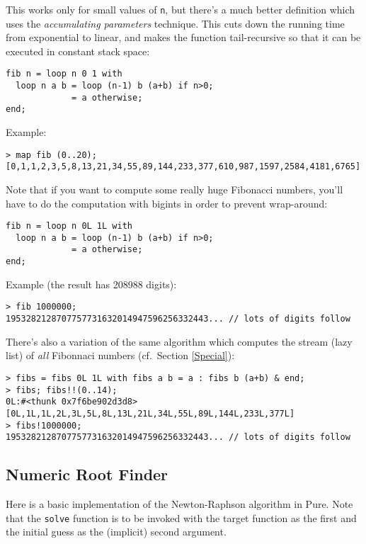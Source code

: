 \documentclass[a4paper,12pt]{article}
\begin{document}
This works only for small values of \verb|n|, but there's a much better
definition which uses the \emph{accumulating parameters} technique. This cuts
down the running time from exponential to linear, and makes the function
tail-recursive so that it can be executed in constant stack space:

\begin{lstlisting}
fib n = loop n 0 1 with
  loop n a b = loop (n-1) b (a+b) if n>0;
             = a otherwise;
end;
\end{lstlisting}

\noindent Example:

\begin{lstlisting}
> map fib (0..20);
[0,1,1,2,3,5,8,13,21,34,55,89,144,233,377,610,987,1597,2584,4181,6765]
\end{lstlisting}

Note that if you want to compute some really huge Fibonacci numbers, you'll
have to do the computation with bigints in order to prevent wrap-around:

\begin{lstlisting}
fib n = loop n 0L 1L with
  loop n a b = loop (n-1) b (a+b) if n>0;
             = a otherwise;
end;
\end{lstlisting}

\noindent Example (the result has 208988 digits):

\begin{lstlisting}
> fib 1000000;
1953282128707757731632014947596256332443... // lots of digits follow
\end{lstlisting}

There's also a variation of the same algorithm which computes the stream (lazy list) of \emph{all} Fibonnaci numbers (cf.\ Section \ref{Special}):

\begin{lstlisting}
> fibs = fibs 0L 1L with fibs a b = a : fibs b (a+b) & end;
> fibs; fibs!!(0..14);
0L:#<thunk 0x7f6be902d3d8>
[0L,1L,1L,2L,3L,5L,8L,13L,21L,34L,55L,89L,144L,233L,377L]
> fibs!1000000;
1953282128707757731632014947596256332443... // lots of digits follow
\end{lstlisting}

\subsection{Numeric Root Finder}

Here is a basic implementation of the Newton-Raphson algorithm in Pure. Note
that the \verb|solve| function is to be invoked with the target function as
the first and the initial guess as the (implicit) second argument.
\end{document}
